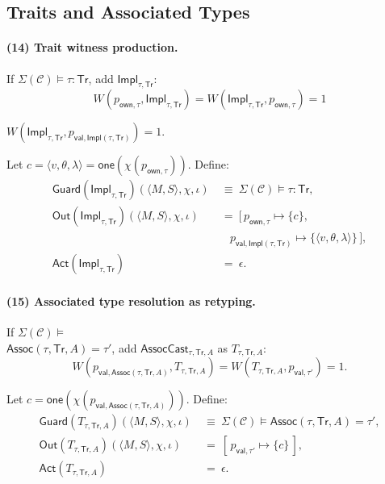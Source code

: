 \documentclass[sigconf]{acmart}
\begin{document}
\subsection{Traits and Associated Types}
\label{sec:method:traits}

\paragraph{(14) Trait witness production.}
If $\Sigma(\mathcal{C})\models \tau:\mathsf{Tr}$, add $\mathsf{Impl}_{\tau,\mathsf{Tr}}$:
\begin{equation*}
W(p_{\mathsf{own},\tau},\mathsf{Impl}_{\tau,\mathsf{Tr}})=W(\mathsf{Impl}_{\tau,\mathsf{Tr}},p_{\mathsf{own},\tau})=1
\end{equation*}

$W(\mathsf{Impl}_{\tau,\mathsf{Tr}},p_{\mathsf{val},\mathsf{Impl}(\tau,\mathsf{Tr})})=1.$

Let $c=\langle v,\theta,\lambda\rangle=\mathsf{one}(\chi(p_{\mathsf{own},\tau}))$. Define:
\begin{align*}
\mathsf{Guard}(\mathsf{Impl}_{\tau,\mathsf{Tr}})(\langle M,S\rangle,\chi,\iota)
&~\equiv~ \Sigma(\mathcal{C})\models \tau:\mathsf{Tr},\\
\mathsf{Out}(\mathsf{Impl}_{\tau,\mathsf{Tr}})(\langle M,S\rangle,\chi,\iota)
&~=~ [\,p_{\mathsf{own},\tau}\mapsto \{c\},\\
&\quad p_{\mathsf{val},\mathsf{Impl}(\tau,\mathsf{Tr})}\mapsto \{\langle v,\theta,\lambda\rangle\}\,],\\
\mathsf{Act}(\mathsf{Impl}_{\tau,\mathsf{Tr}})
&~=~ \epsilon.
\end{align*}

\paragraph{(15) Associated type resolution as retyping.}
If $\Sigma(\mathcal{C}) \models $ \\
$\mathsf{Assoc}(\tau,\mathsf{Tr},A)=\tau'$, add $\mathsf{AssocCast}_{\tau,\mathsf{Tr},A}$ as $T_{\tau,\mathsf{Tr},A}$:
\begin{equation*}
    W(p_{\mathsf{val},\mathsf{Assoc}(\tau,\mathsf{Tr},A)},T_{\tau,\mathsf{Tr},A})=
W(T_{\tau,\mathsf{Tr},A},p_{\mathsf{val},\tau'})=1.
\end{equation*}

Let $c=\mathsf{one}(\chi(p_{\mathsf{val},\mathsf{Assoc}(\tau,\mathsf{Tr},A)}))$. Define:
\begin{align*}
\mathsf{Guard}(T_{\tau,\mathsf{Tr},A})(\langle M,S\rangle,\chi,\iota)
&~\equiv~ \Sigma(\mathcal{C})\models \mathsf{Assoc}(\tau,\mathsf{Tr},A)=\tau',\\
\mathsf{Out}(T_{\tau,\mathsf{Tr},A})(\langle M,S\rangle,\chi,\iota)
&~=~ [\,p_{\mathsf{val},\tau'}\mapsto \{c\}\,],\\
\mathsf{Act}(T_{\tau,\mathsf{Tr},A})
&~=~ \epsilon.
\end{align*}
\end{document}
